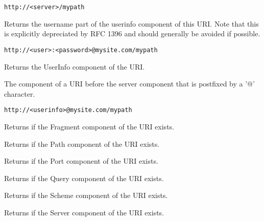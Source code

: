 \tt{http://<server>/mypath}


\label{wxurigetuser}


Returns the username part of the userinfo component of
this URI.  Note that this is explicitly depreciated by
RFC 1396 and should generally be avoided if possible.

\tt{http://<user>:<password>@mysite.com/mypath}


\label{wxurigetuserinfo}


Returns the UserInfo component of the URI.

The component of a URI before the server component
that is postfixed by a '@' character.

\tt{http://<userinfo>@mysite.com/mypath}


\label{wxurihasfragment}


Returns \true if the Fragment component of the URI exists.


\label{wxurihaspath}


Returns \true if the Path component of the URI exists.


\label{wxurihasport}


Returns \true if the Port component of the URI exists.


\label{wxurihasquery}


Returns \true if the Query component of the URI exists.


\label{wxurihasscheme}


Returns \true if the Scheme component of the URI exists.


\label{wxurihasserver}


Returns \true if the Server component of the URI exists.


